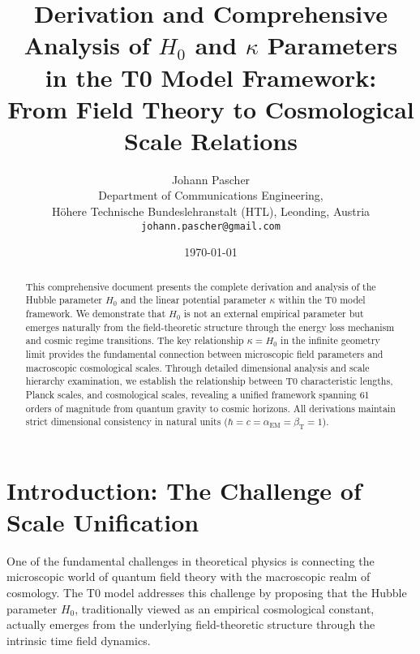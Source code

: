 \documentclass[12pt,a4paper]{article}
\begin{document}
	
	\title{Derivation and Comprehensive Analysis of $H_0$ and $\kappa$ Parameters \\
		in the T0 Model Framework: \\
		From Field Theory to Cosmological Scale Relations}
	\author{Johann Pascher\\
		Department of Communications Engineering, \\H{\"o}here Technische Bundeslehranstalt (HTL), Leonding, Austria\\
		\texttt{johann.pascher@gmail.com}}
	\date{\today}
	
	\maketitle
	
	\begin{abstract}
		This comprehensive document presents the complete derivation and analysis of the Hubble parameter $H_0$ and the linear potential parameter $\kappa$ within the T0 model framework. We demonstrate that $H_0$ is not an external empirical parameter but emerges naturally from the field-theoretic structure through the energy loss mechanism and cosmic regime transitions. The key relationship $\kappa = H_0$ in the infinite geometry limit provides the fundamental connection between microscopic field parameters and macroscopic cosmological scales. Through detailed dimensional analysis and scale hierarchy examination, we establish the relationship between T0 characteristic lengths, Planck scales, and cosmological scales, revealing a unified framework spanning 61 orders of magnitude from quantum gravity to cosmic horizons. All derivations maintain strict dimensional consistency in natural units ($\hbar = c = \alpha_{\text{EM}} = \beta_{\text{T}} = 1$).
	\end{abstract}
	
	\tableofcontents
	\newpage
	
	\section{Introduction: The Challenge of Scale Unification}
	\label{sec:introduction}
	
	One of the fundamental challenges in theoretical physics is connecting the microscopic world of quantum field theory with the macroscopic realm of cosmology. The T0 model addresses this challenge by proposing that the Hubble parameter $H_0$, traditionally viewed as an empirical cosmological constant, actually emerges from the underlying field-theoretic structure through the intrinsic time field dynamics.
	
\end{document}

